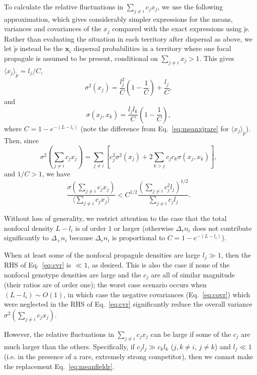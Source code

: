 \documentclass[11pt]{article}
\begin{document}
To calculate the relative fluctuations in $\sum_{j\neq i} c_j x_j$, we use the following approximation, which gives considerably simpler expressions for the means, variances and covariances of the $x_j$ compared with the exact expressions using $\tilde{p}$. Rather than evaluating the situation in each territory after dispersal as above, we let $\tilde{p}$ instead be the ${\mathbf x_i}$ dispersal probabilities in a territory where one focal propagule is assumed to be present, conditional on $\sum_{j\neq i} x_j>1$. This gives $\langle x_j \rangle_{\tilde{p}}=l_j/C$, 
\begin{equation}
\sigma^2(x_j)=\frac{l_j^2}{C}\left(1-\frac{1}{C}\right)+\frac{l_j}{C},\label{eq:varr}
\end{equation}
and 
\begin{equation}
\sigma(x_j,x_k)=\frac{l_j l_k}{C}\left(1-\frac{1}{C}\right),\label{eq:covr}
\end{equation}
where $C=1-e^{-(L-l_i)}$ (note the difference from Eq.~\eqref{eq:meanxjrare} for $\langle x_j \rangle_{\tilde{p}}$). Then, since
\begin{equation}
\sigma^2(\sum_{j\neq i} c_j x_j)=\sum_{j\neq i}\left[c_j^2\sigma^2(x_j)+2\sum_{k>j}c_j c_k\sigma(x_j,x_k)\right],\label{eq:vartotr}
\end{equation}
and $1/C>1$, we have
\begin{equation}
\frac{\sigma(\sum_{j\neq i} c_j x_j)}{\langle\sum_{j\neq i} c_j x_j\rangle}<C^{1/2}\frac{\left(\sum_{j\neq i}c_j^2 l_j\right)^{1/2}}{\sum_{j\neq i}c_j l_j}. \label{eq:cvr}
\end{equation}

Without loss of generality, we restrict attention to the case that the total nonfocal density $L-l_i$ is of order $1$ or larger (otherwise $\Delta_r n_i$ does not contribute significantly to $\Delta_+ n_i$ because $\Delta_r n_i$ is proportional to $C=1-e^{-(L-l_i)}$).

When at least some of the nonfocal propagule densities are large $l_j\gg 1$, then the RHS of Eq.~\eqref{eq:cvr} is $\ll 1$, as desired. This is also the case if none of the nonfocal genotype densities are large and the $c_j$ are all of similar magnitude (their ratios are of order one); the worst case scenario occurs when $(L-l_i)\sim O(1)$, in which case the negative covariances (Eq.~\eqref{eq:covr}) which were neglected in the RHS of Eq.~\eqref{eq:cvr} significantly reduce the overall variance $\sigma^2(\sum_{j\neq i} c_j x_j)$.

However, the relative fluctuations in $\sum_{j\neq i} c_j x_j$ can be large if some of the $c_j$ are much larger than the others. Specifically, if $c_j l_j\gg c_k l_k$ ($j,k\neq i$, $j\neq k$) and $l_j\ll 1$ (i.e. in the presence of a rare, extremely strong competitor), then we cannot make the replacement Eq.~\eqref{eq:meanfieldr}. 
\end{document}
